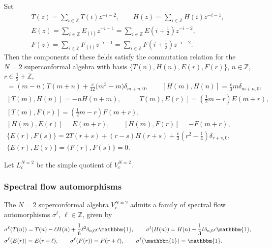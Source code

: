 \documentclass[pdftex]{sigma}
\numberwithin{equation}{section}
\newcommand{\Z}{\mathbb Z}
\begin{document}
Set
\begin{gather*}
 T(z) = \sum _{i \in {\Z}} T(i) z^{-i-2}, \qquad H(z) = \sum _{i \in {\Z}} H(i) z^{-i-1},\\
 E(z) = \sum _{i \in {\Z}} E_{(i)} z^{-i-1} = \sum _{i \in {\Z}} E\left(i+\frac{1}{2}\right)z^{-i-2},\\
 F(z) = \sum _{i \in {\Z}} F_{(i)} z^{-i-1} = \sum _{i \in {\Z}} F\left(i+\frac{1}{2}\right)z^{-i-2}.
 \end{gather*}
 Then the components of these fields satisfy the commutation relation for the $N=2$ superconformal algebra with basis $\{T(n), H(n), E(r), F(r)\}$, $n \in \mathbb{Z}$, $r \in \frac{1}{2}+\mathbb{Z}$,
\begin{gather*}
	[T(m), T(n)] = (m-n)T(m+n) + \frac{c}{12}\bigl(m^3 - m\bigr)\delta_{m+n,0}, \qquad [H(m), H(n)] = \frac{c}{3}m\delta_{m+n,0}, \\
	[T(m), H(n)] = -nH(n+m), \qquad [ T(m) , E(r) ] = \left(\frac{1}{2} m-r \right)E(m+r), \\
 [ T(m) , F(r) ] = \left(\frac{1}{2} m-r \right)F(m+r), \\
	[ H(m) ,E(r)] = E(m+r), \qquad [ H(m) , F(r)] = -F(m+r), \\
	\{E(r), F(s) \} = 2 T({r + s}) + ( r - s )H(r + s) + \frac{c}{3}\left( r^2 - \frac{1}{4} \right)\delta_{r+s,0}, \\
	\{E(r), E(s) \} = \{F(r), F(s) \} = 0.
\end{gather*}

 Let $L^{N=2}_{c}$ be the simple quotient of $V^{N=2}_{c}$.

\subsubsection{Spectral flow automorphisms}
The $N=2$ superconformal algebra $V^{N=2}_{c}$ admits a family of spectral flow automorphisms $\sigma^\ell$, $\ell \in \mathbb{Z}$, given by
\begin{align*}
\begin{aligned}
	& \sigma^\ell(T(n))= T(n) -\ell H(n) + \frac{1}{6}\ell ^2\delta_{n,0}c\mathbbm{1}, \qquad \sigma^l(H(n)) = H(n) + \frac{1}{3}\ell \delta_{n,0}c\mathbbm{1},  \\
	& \sigma^\ell(E(r))= E({r-\ell}), \qquad \sigma^\ell(F(r)) = F({r+\ell}), \qquad \sigma^\ell(\mathbbm{1}) = \mathbbm{1}.
\end{aligned}
\end{align*}
\end{document}
